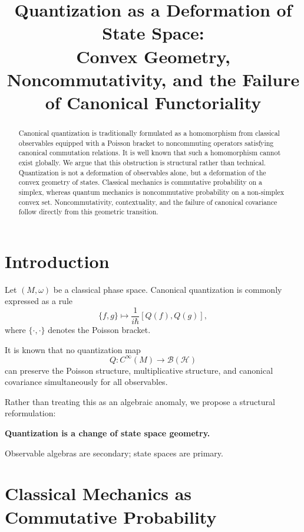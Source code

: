 \documentclass[11pt]{article}
\title{Quantization as a Deformation of State Space:\\
Convex Geometry, Noncommutativity, and the Failure of Canonical Functoriality}
\author{}
\date{}
\begin{document}
\maketitle

\begin{abstract}
Canonical quantization is traditionally formulated as a homomorphism
from classical observables equipped with a Poisson bracket
to noncommuting operators satisfying canonical commutation relations.
It is well known that such a homomorphism cannot exist globally.
We argue that this obstruction is structural rather than technical.
Quantization is not a deformation of observables alone,
but a deformation of the convex geometry of states.
Classical mechanics is commutative probability on a simplex,
whereas quantum mechanics is noncommutative probability on a non-simplex convex set.
Noncommutativity, contextuality, and the failure of canonical covariance
follow directly from this geometric transition.
\end{abstract}

\tableofcontents

\section{Introduction}

Let $(M,\omega)$ be a classical phase space.
Canonical quantization is commonly expressed as a rule
\begin{equation}
\{f,g\} \longmapsto \frac{1}{i\hbar}[Q(f),Q(g)],
\end{equation}
where $\{\cdot,\cdot\}$ denotes the Poisson bracket.

It is known that no quantization map
\[
Q: C^\infty(M) \to \mathcal{B}(\mathcal{H})
\]
can preserve the Poisson structure, multiplicative structure,
and canonical covariance simultaneously for all observables.

Rather than treating this as an algebraic anomaly,
we propose a structural reformulation:

\begin{center}
\textbf{Quantization is a change of state space geometry.}
\end{center}

Observable algebras are secondary; state spaces are primary.

\section{Classical Mechanics as Commutative Probability}
\end{document}
